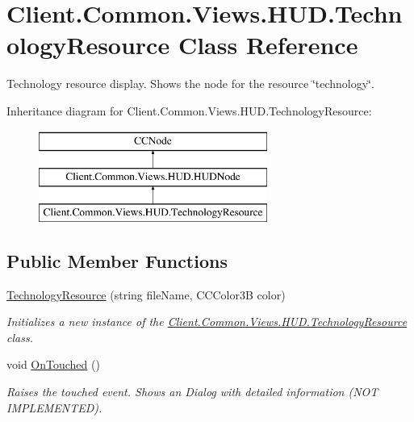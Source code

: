 \hypertarget{classClient_1_1Common_1_1Views_1_1HUD_1_1TechnologyResource}{}\section{Client.\+Common.\+Views.\+H\+U\+D.\+Technology\+Resource Class Reference}
\label{classClient_1_1Common_1_1Views_1_1HUD_1_1TechnologyResource}


Technology resource display. Shows the node for the resource \char`\"{}technology\char`\"{}.  


Inheritance diagram for Client.\+Common.\+Views.\+H\+U\+D.\+Technology\+Resource\+:\begin{figure}[H]
\begin{center}
\leavevmode
\includegraphics[height=3.000000cm]{classClient_1_1Common_1_1Views_1_1HUD_1_1TechnologyResource}
\end{center}
\end{figure}
\subsection*{Public Member Functions}
\begin{DoxyCompactItemize}
\item 
\hyperlink{classClient_1_1Common_1_1Views_1_1HUD_1_1TechnologyResource_af81c7df0c2922894977e8c8c93cf697c}{Technology\+Resource} (string file\+Name, C\+C\+Color3\+B color)
\begin{DoxyCompactList}\small\item\em Initializes a new instance of the \hyperlink{classClient_1_1Common_1_1Views_1_1HUD_1_1TechnologyResource}{Client.\+Common.\+Views.\+H\+U\+D.\+Technology\+Resource} class. \end{DoxyCompactList}\item 
void \hyperlink{classClient_1_1Common_1_1Views_1_1HUD_1_1TechnologyResource_a8b48de39473116b7362ca6ff0c87f2e6}{On\+Touched} ()
\begin{DoxyCompactList}\small\item\em Raises the touched event. Shows an Dialog with detailed information (N\+O\+T I\+M\+P\+L\+E\+M\+E\+N\+T\+E\+D). \end{DoxyCompactList}\end{DoxyCompactItemize}
